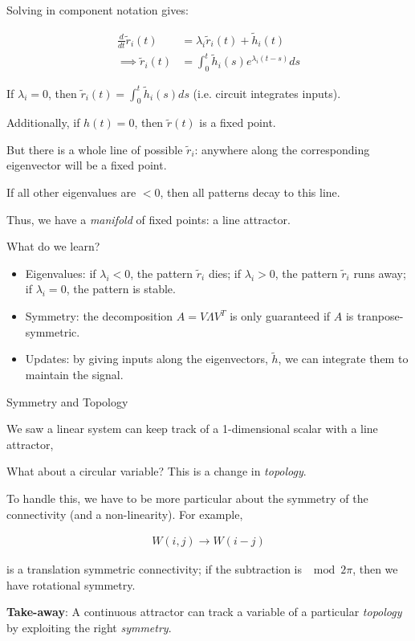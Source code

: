 \documentclass{beamer}
\begin{document}
\begin{frame}
    Solving in component notation gives:

    \begin{align*}
        \frac{d}{dt} \tilde r_i(t) &= \lambda_i \tilde r_i(t) + \tilde h_i(t)\\
        \implies \tilde r_i(t)     &= \int_0^t \tilde h_i(s) e^{\lambda_i (t-s)}ds
    \end{align*}

    \pause If $\lambda_i = 0$, then $\tilde r_i(t) = \int_0^t \tilde h_i(s) ds$ (i.e. circuit integrates inputs).

    \pause Additionally, if $h(t) = 0$, then $\tilde r(t)$ is a fixed point.

    \pause But there is a whole line of possible $\tilde r_i$: anywhere along the corresponding eigenvector will be a fixed point.

    \pause If all other eigenvalues are $<0$, then all patterns decay to this line.
    
    \pause Thus, we have a \emph{manifold} of fixed points: a line attractor.

    \pause What do we learn?
    \begin{itemize}
        \item<1-> Eigenvalues: if $\lambda_i < 0$, the pattern $\tilde r_i$ dies; if $\lambda_i > 0$, the pattern $\tilde r_i$ runs away; if $\lambda_i = 0$, the pattern is stable.
        \item<2-> Symmetry: the decomposition $A = V \Lambda V^T$ is only guaranteed if $A$ is tranpose-symmetric.
        \item<3-> Updates: by giving inputs along the eigenvectors, $\tilde h$, we can integrate them to maintain the signal.
    \end{itemize}
\end{frame}

\begin{frame}{Symmetry and Topology}

    \pause We saw a linear system can keep track of a 1-dimensional scalar with a line attractor,

    \pause What about a circular variable? \pause This is a change in \emph{topology}.

    \pause 
    To handle this, we have to be more particular about the symmetry of the connectivity (and a non-linearity). For example,

    \begin{align*}
        W(i,j) \rightarrow W(i - j)
    \end{align*}

    is a translation symmetric connectivity; if the subtraction is $\mod 2 \pi$, then we have rotational symmetry.

    \pause
    \textbf{Take-away}: A continuous attractor can track a variable of a particular \emph{topology} by exploiting the right \emph{symmetry}.
    
\end{frame}
\end{document}
